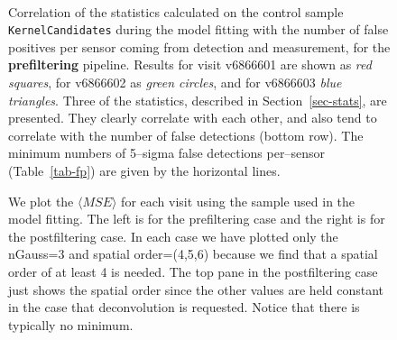 \documentclass[prd, nofootinbib, floatfix, 11pt,tightenlines,times]{article}
\begin{document}
{\begin{figure}
 \\
\caption{Correlation of the statistics calculated on the control
  sample {\tt KernelCandidates} during the model fitting with the
  number of false positives per sensor coming from detection and
  measurement, for the {\bf prefiltering} pipeline.  Results for visit
  v6866601 are shown as {\it red squares}, for v6866602 as {\it green
    circles}, and for v6866603 {\it blue triangles}.  Three of the
  statistics, described in Section~\ref{sec-stats}, are presented.
  They clearly correlate with each other, and also tend to correlate
  with the number of false detections (bottom row).
  The minimum numbers of 5--sigma false detections per--sensor (Table~\ref{tab-fp})
  are given by the horizontal lines.
}
\label{corrpre}
\end{figure}

\begin{figure}%
\centering
{}
\caption{We plot the $\langle MSE \rangle$ for each visit using the sample used in the model fitting.  
The left is for the prefiltering case and the right is for the 
postfiltering case.  In each case we have plotted only the nGauss=3 and spatial order=(4,5,6) because we find that a spatial
order of at least 4 is needed.  The top pane in the postfiltering case just shows the spatial order since the other 
values are held constant in the case that deconvolution is requested.  Notice that there is typically no minimum.}
\label{fig-MSE_FITTED}
\end{figure}

}
\end{document}
